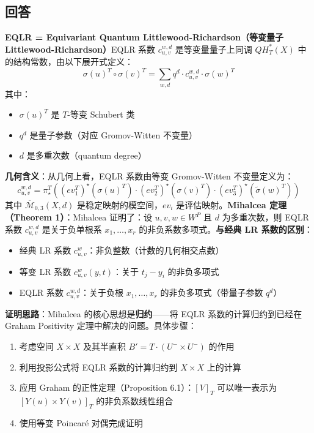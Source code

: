 \subsection{回答}
\textbf{EQLR = Equivariant Quantum Littlewood-Richardson（等变量子 Littlewood-Richardson）}EQLR 系数 $c_{u,v}^{w,d}$ 是等变量量子上同调 $QH_T^*(X)$ 中的结构常数，由以下展开式定义：$$\sigma(u)^T \circ \sigma(v)^T = \sum_{w,d} q^d \cdot c_{u,v}^{w,d} \cdot \sigma(w)^T$$其中：
\begin{itemize}
\item $\sigma(u)^T$ 是 $T$-等变 Schubert 类
\item $q^d$ 是量子参数（对应 Gromov-Witten 不变量）
\item $d$ 是多重次数（quantum degree）
\end{itemize}

\textbf{几何含义}：从几何上看，EQLR 系数由等变 Gromov-Witten 不变量定义为：$$c_{u,v}^{w,d} = \pi_{\star}^T \left((ev_1^T)^{\star}(\sigma(u)^T) \cdot (ev_2^T)^{\star}(\sigma(v)^T) \cdot (ev_3^T)^{\star}(\widetilde{\sigma}(w)^T)\right)$$其中 $\overline{\mathcal{M}}_{0,3}(X,d)$ 是稳定映射的模空间，$ev_i$ 是评估映射。\textbf{Mihalcea 定理（Theorem 1）}：Mihalcea 证明了：设 $u, v, w \in W^P$ 且 $d$ 为多重次数，则 EQLR 系数 $c_{u,v}^{w,d}$ 是关于负单根系 $x_1, \ldots, x_r$ 的非负系数多项式。\textbf{与经典 LR 系数的区别}：
\begin{itemize}
\item 经典 LR 系数 $c_{u,v}^w$：非负整数（计数的几何相交点数）
\item 等变 LR 系数 $c_{u,v}^w(y,t)$：关于 $t_j - y_i$ 的非负多项式
\item EQLR 系数 $c_{u,v}^{w,d}$：关于负根 $x_1, \ldots, x_r$ 的非负多项式（带量子参数 $q^d$）
\end{itemize}

\textbf{证明思路}：Mihalcea 的核心思想是\textbf{归约}——将 EQLR 系数的计算归约到已经在 Graham Positivity 定理中解决的问题。具体步骤：
\begin{enumerate}
\item 考虑空间 $X \times X$ 及其半直积 $B' = T \cdot (U^- \times U^-)$ 的作用
\item 利用投影公式将 EQLR 系数的计算归约到 $X \times X$ 上的计算
\item 应用 Graham 的正性定理（Proposition 6.1）：$[V]_T$ 可以唯一表示为 $[Y(u) \times Y(v)]_T$ 的非负系数线性组合
\item 使用等变 Poincaré 对偶完成证明
\end{enumerate}


